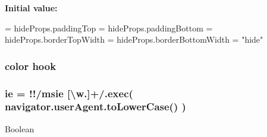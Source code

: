 {\bfseries Initial value\+:}
\begin{DoxyCode}
= hideProps.paddingTop = hideProps.paddingBottom =
    hideProps.borderTopWidth = hideProps.borderBottomWidth = \textcolor{stringliteral}{"hide"}
\end{DoxyCode}
\hypertarget{jquery-ui_8js_ad0d675b395ff1b395f5159116e3ede75}{
\subsubsection[{hook}]{\setlength{\rightskip}{0pt plus 5cm}color hook}}\label{jquery-ui_8js_ad0d675b395ff1b395f5159116e3ede75}
\hypertarget{jquery-ui_8js_a7434fb8cf6da72f87b732a8a052232a3}{
\subsubsection[{ie}]{\setlength{\rightskip}{0pt plus 5cm}ie = !!/msie \mbox{[}\textbackslash{}w.\mbox{]}+/.exec( navigator.\+user\+Agent.\+to\+Lower\+Case() )}}\label{jquery-ui_8js_a7434fb8cf6da72f87b732a8a052232a3}
Boolean 

